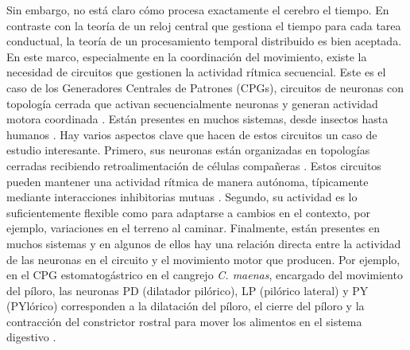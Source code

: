 Sin embargo, no está claro cómo procesa exactamente el cerebro el tiempo. En contraste con la teoría de un reloj central que gestiona el tiempo para cada tarea conductual, la teoría de un procesamiento temporal distribuido \parencite{buonomano_temporal_1995,ivry_representation_1996} es bien aceptada. En este marco, especialmente en la coordinación del movimiento, existe la necesidad de circuitos que gestionen la actividad rítmica secuencial. Este es el caso de los Generadores Centrales de Patrones (CPGs), circuitos de neuronas con topología cerrada que activan secuencialmente neuronas y generan actividad motora coordinada \parencite{selverston_reliable_2000}. Están presentes en muchos sistemas, desde insectos hasta humanos \parencite{pearson_central_1972,marder_central_2001,mackay-lyons_central_2002,minassian_human_2017}. Hay varios aspectos clave que hacen de estos circuitos un caso de estudio interesante. Primero, sus neuronas están organizadas en topologías cerradas recibiendo retroalimentación de células compañeras \parencite{huerta_topology_2001}. Estos circuitos pueden mantener una actividad rítmica de manera autónoma, típicamente mediante interacciones inhibitorias mutuas \parencite{katz_evolution_nodate}. Segundo, su actividad es lo suficientemente flexible como para adaptarse a cambios en el contexto, por ejemplo, variaciones en el terreno al caminar. Finalmente, están presentes en muchos sistemas y en algunos de ellos hay una relación directa entre la actividad de las neuronas en el circuito y el movimiento motor que producen. Por ejemplo, en el CPG estomatogástrico en el cangrejo \textit{C. maenas}, encargado del movimiento del píloro, las neuronas PD (dilatador pilórico), LP (pilórico lateral) y PY (PYlórico) corresponden a la dilatación del píloro, el cierre del píloro y la contracción del constrictor rostral para mover los alimentos en el sistema digestivo \parencite{moulins_introduction_1987,selverston_oscillations_2006}.

